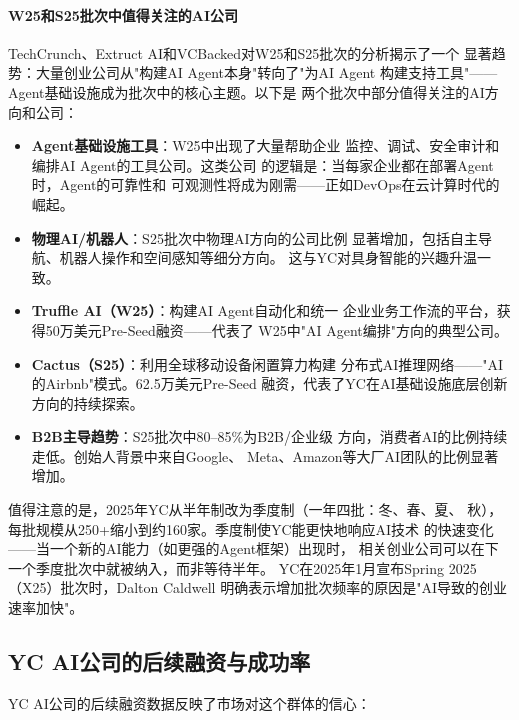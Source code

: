 \paragraph{W25和S25批次中值得关注的AI公司}

TechCrunch、Extruct AI和VCBacked对W25和S25批次的分析揭示了一个
显著趋势：大量创业公司从"构建AI Agent本身"转向了"为AI Agent
构建支持工具"——Agent基础设施成为批次中的核心主题。以下是
两个批次中部分值得关注的AI方向和公司：

\begin{itemize}
  \item \textbf{Agent基础设施工具}：W25中出现了大量帮助企业
    监控、调试、安全审计和编排AI Agent的工具公司。这类公司
    的逻辑是：当每家企业都在部署Agent时，Agent的可靠性和
    可观测性将成为刚需——正如DevOps在云计算时代的崛起。
  \item \textbf{物理AI/机器人}：S25批次中物理AI方向的公司比例
    显著增加，包括自主导航、机器人操作和空间感知等细分方向。
    这与YC对具身智能的兴趣升温一致。
  \item \textbf{Truffle AI（W25）}：构建AI Agent自动化和统一
    企业业务工作流的平台，获得50万美元Pre-Seed融资——代表了
    W25中"AI Agent编排"方向的典型公司。
  \item \textbf{Cactus（S25）}：利用全球移动设备闲置算力构建
    分布式AI推理网络——"AI的Airbnb"模式。62.5万美元Pre-Seed
    融资，代表了YC在AI基础设施底层创新方向的持续探索。
  \item \textbf{B2B主导趋势}：S25批次中80--85\%为B2B/企业级
    方向，消费者AI的比例持续走低。创始人背景中来自Google、
    Meta、Amazon等大厂AI团队的比例显著增加。
\end{itemize}

值得注意的是，2025年YC从半年制改为季度制（一年四批：冬、春、夏、
秋），每批规模从250+缩小到约160家。季度制使YC能更快地响应AI技术
的快速变化——当一个新的AI能力（如更强的Agent框架）出现时，
相关创业公司可以在下一个季度批次中就被纳入，而非等待半年。
YC在2025年1月宣布Spring 2025（X25）批次时，Dalton Caldwell
明确表示增加批次频率的原因是"AI导致的创业速率加快"。

\subsection{YC AI公司的后续融资与成功率}
\label{subsec:fund-yc-follow-on}

YC AI公司的后续融资数据反映了市场对这个群体的信心：

